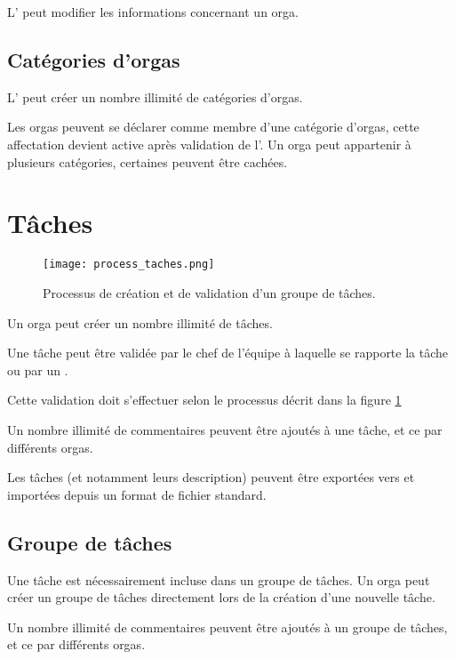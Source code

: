 L' \oh{} peut modifier les informations concernant un orga.


\subsection{Catégories d'orgas}
L'\oh{} peut créer un nombre illimité de catégories d'orgas.

Les orgas peuvent se déclarer comme membre d'une catégorie d'orgas, cette affectation devient active après validation de l'\oh{}. Un orga peut appartenir à plusieurs catégories, certaines peuvent être cachées.

\section{Tâches}

\begin{figure}[h!t]
\centering
\texttt{[image: process\_taches.png]}
\label{fig:ptaches}
\caption{Processus de création et de validation d'un groupe de tâches.}
\end{figure}


Un orga peut créer un nombre illimité de tâches.

Une tâche peut être validée par le chef de l'équipe à laquelle se rapporte la tâche ou par un \oh{}.

Cette validation doit s'effectuer selon le processus décrit dans la figure \ref{fig:ptaches}

Un nombre illimité de commentaires peuvent être ajoutés à une tâche, et ce par différents orgas.

Les tâches (et notamment leurs description) peuvent être exportées vers et importées depuis un format de fichier standard.


\subsection{Groupe de tâches}
Une tâche est nécessairement incluse dans un groupe de tâches.
Un orga peut créer un groupe de tâches directement lors de la création d'une nouvelle tâche.

Un nombre illimité de commentaires peuvent être ajoutés à un groupe de tâches, et ce par différents orgas.

